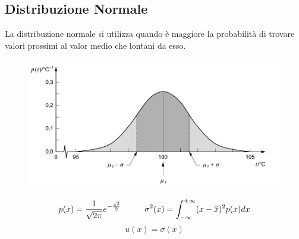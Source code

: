 \documentclass[a4paper, 15pt]{article}
\begin{document}
\subsection{Distribuzione Normale}
\begin{adjustwidth}{2in}{}
	La distribuzione normale si utilizza quando è maggiore la probabilità di
	trovare valori prossimi al valor medio che lontani da esso. 	
	\begin{figure}[H]
		\centering
		\includegraphics[width=0.5\linewidth]{fig/screenshot001}
		\label{fig:screenshot001}
	\end{figure}
	\[ p(x) = {1\over\sqrt{2\pi}}e^{-{x^2\over2}} \hspace{1cm} \sigma^2(x) = \int_{-\infty}^{+\infty}(x-\overline{x})^2p(x)dx\]
	\[u(x) = \sigma(x) \]
\end{adjustwidth}
\end{document}

